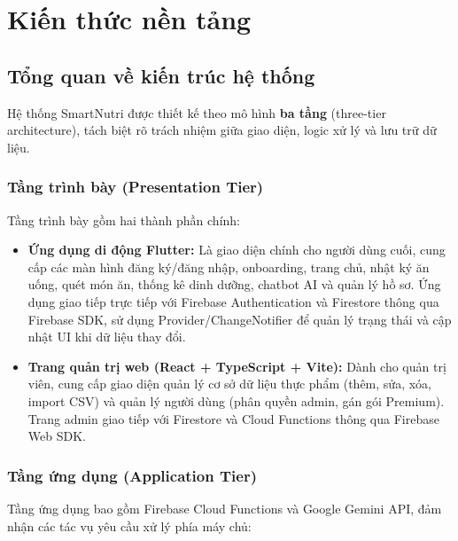 
\chapter{Kiến thức nền tảng}

\section{Tổng quan về kiến trúc hệ thống}

Hệ thống SmartNutri được thiết kế theo mô hình \textbf{ba tầng} (three-tier architecture), tách biệt rõ trách nhiệm giữa giao diện, logic xử lý và lưu trữ dữ liệu.

\subsection{Tầng trình bày (Presentation Tier)}

Tầng trình bày gồm hai thành phần chính:

\begin{itemize}
    \item \textbf{Ứng dụng di động Flutter:} Là giao diện chính cho người dùng cuối, cung cấp các màn hình đăng ký/đăng nhập, onboarding, trang chủ, nhật ký ăn uống, quét món ăn, thống kê dinh dưỡng, chatbot AI và quản lý hồ sơ. Ứng dụng giao tiếp trực tiếp với Firebase Authentication và Firestore thông qua Firebase SDK, sử dụng Provider/ChangeNotifier để quản lý trạng thái và cập nhật UI khi dữ liệu thay đổi.
    \item \textbf{Trang quản trị web (React + TypeScript + Vite):} Dành cho quản trị viên, cung cấp giao diện quản lý cơ sở dữ liệu thực phẩm (thêm, sửa, xóa, import CSV) và quản lý người dùng (phân quyền admin, gán gói Premium). Trang admin giao tiếp với Firestore và Cloud Functions thông qua Firebase Web SDK.
\end{itemize}

\subsection{Tầng ứng dụng (Application Tier)}

Tầng ứng dụng bao gồm Firebase Cloud Functions và Google Gemini API, đảm nhận các tác vụ yêu cầu xử lý phía máy chủ:

